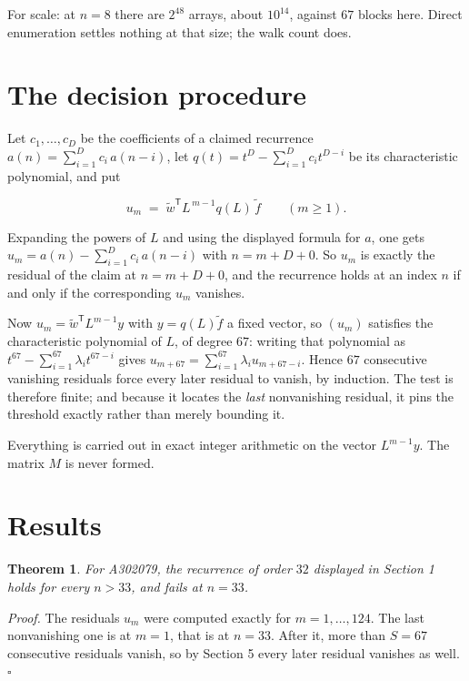 \documentclass[11pt]{article}
\newtheorem{theorem}{Theorem}
\theoremstyle{definition}
\begin{document}
For scale: at $n = 8$ there are $2^{48}$ arrays, about $10^{14}$, against $67$ blocks here. Direct enumeration settles nothing at that size; the walk count does.

\section{The decision procedure}

Let $c_1,\dots,c_D$ be the coefficients of a claimed recurrence $a(n) = \sum_{i=1}^{D} c_i\,a(n-i)$, let $q(t) = t^{D} - \sum_{i=1}^{D} c_i t^{D-i}$ be its characteristic polynomial, and put

\[u_m \;=\; \tilde w^{\mathsf T} L^{\,m-1} q(L)\,\tilde f \qquad (m \ge 1).\]

Expanding the powers of $L$ and using the displayed formula for $a$, one gets $u_m = a(n) - \sum_{i=1}^{D} c_i\,a(n-i)$ with $n = m + D + 0$. So $u_m$ is exactly the residual of the claim at $n = m + D + 0$, and the recurrence holds at an index $n$ if and only if the corresponding $u_m$ vanishes.

Now $u_m = \tilde w^{\mathsf T} L^{m-1} y$ with $y = q(L)\tilde f$ a fixed vector, so $(u_m)$ satisfies the characteristic polynomial of $L$, of degree $67$: writing that polynomial as $t^{67} - \sum_{i=1}^{67} \lambda_i t^{67-i}$ gives $u_{m+67} = \sum_{i=1}^{67} \lambda_i u_{m+67-i}$. Hence $67$ consecutive vanishing residuals force every later residual to vanish, by induction. The test is therefore finite; and because it locates the {\itshape last} nonvanishing residual, it pins the threshold exactly rather than merely bounding it.

Everything is carried out in exact integer arithmetic on the vector $L^{m-1}y$. The matrix $M$ is never formed.

\section{Results}

\begin{theorem} For A302079, the recurrence of order $32$ displayed in Section 1 holds for every $n > 33$, and fails at $n = 33$.\end{theorem}

{\itshape Proof.} The residuals $u_m$ were computed exactly for $m = 1,\dots,124$. The last nonvanishing one is at $m = 1$, that is at $n = 33$. After it, more than $S = 67$ consecutive residuals vanish, so by Section 5 every later residual vanishes as well. $\square$
\end{document}
